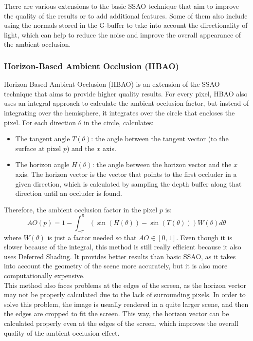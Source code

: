 There are various extensions to the basic SSAO technique that aim to improve the quality of the results or to add additional features. Some of them also include using the normals stored in the G-buffer to take into account the directionality of light, which can help to reduce the noise and improve the overall appearance of the ambient occlusion. 


\subsubsection{Horizon-Based Ambient Occlusion (HBAO)}

Horizon-Based Ambient Occlusion (HBAO) is an extension of the SSAO technique that aims to provide higher quality results. For every pixel, HBAO also uses an integral approach to calculate the ambient occlusion factor, but instead of integrating over the hemisphere, it integrates over the circle that encloses the pixel. For each direction $\theta$ in the circle, calculates:
\begin{itemize}
    \item The tangent angle $T(\theta)$: the angle between the tangent vector (to the surface at pixel $p$) and the $x$ axis.
    \item The horizon angle $H(\theta)$: the angle between the horizon vector and the $x$ axis. The horizon vector is the vector that points to the first occluder in a given direction, which is calculated by sampling the depth buffer along that direction until an occluder is found.
\end{itemize}

Therefore, the ambient occlusion factor in the pixel $p$ is:
\begin{equation*}
    AO(p) = 1 - \int_{-\pi}^{\pi} \left(\sin(H(\theta)) - \sin(T(\theta))\right) W(\theta) d\theta
\end{equation*}
where $W(\theta)$ is just a factor needed so that $AO\in [0,1]$. Even though it is slower because of the integral, this method is still really efficient because it also uses Deferred Shading. It provides better results than basic SSAO, as it takes into account the geometry of the scene more accurately, but it is also more computationally expensive.\\

This method also faces problems at the edges of the screen, as the horizon vector may not be properly calculated due to the lack of surrounding pixels. In order to solve this problem, the image is usually rendered in a quite larger scene, and then the edges are cropped to fit the screen. This way, the horizon vector can be calculated properly even at the edges of the screen, which improves the overall quality of the ambient occlusion effect.